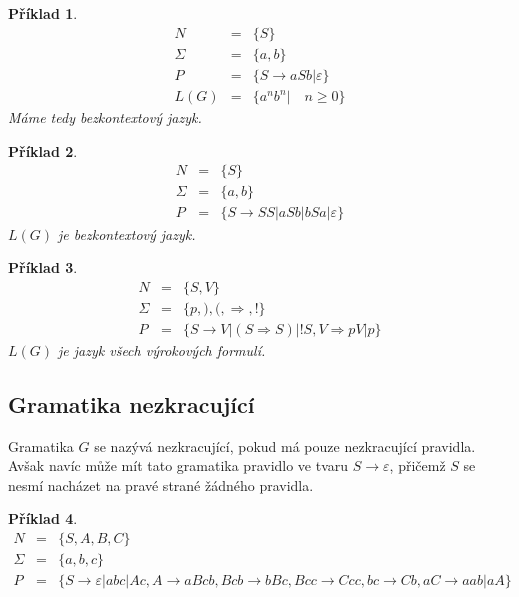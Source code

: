 \documentclass[10pt, a4paper, titlepage]{article}
\theoremstyle{note}
\newtheorem{priklad}{Příklad}
\begin{document}
\vspace{30px}

\begin{priklad}
\begin{eqnarray*}
N &=& \lbrace S \rbrace \\
\Sigma &=& \lbrace a, b \rbrace \\
P &=& \lbrace S \rightarrow aSb | \varepsilon \rbrace \\
L(G) &=& \lbrace a^{n}b^{n} | \quad n \geq 0 \rbrace
\end{eqnarray*}
Máme tedy \emph{bezkontextový} jazyk.
\end{priklad}

\begin{priklad}
\begin{eqnarray*}
N &=& \lbrace S \rbrace \\
\Sigma &=& \lbrace a, b \rbrace \\
P &=& \lbrace S \rightarrow SS|aSb|bSa| \varepsilon \rbrace
\end{eqnarray*}
$L(G)$ je \emph{bezkontextový} jazyk.
\end{priklad}

\begin{priklad}
\begin{eqnarray*}
N &=& \lbrace S, V \rbrace \\
\Sigma &=& \lbrace p,),(, \Rightarrow, ! \rbrace \\
P &=& \lbrace S \rightarrow V|(S \Rightarrow S)|!S, V \Rightarrow pV|p \rbrace
\end{eqnarray*}
$L(G)$ je jazyk všech výrokových formulí.
\end{priklad}


\subsection{Gramatika nezkracující}
Gramatika $G$ se nazývá nezkracující, pokud má pouze nezkracující
pravidla. Avšak navíc může mít tato gramatika pravidlo ve
tvaru $S \rightarrow \varepsilon$, přičemž $S$ se nesmí nacházet na pravé strané žádného pravidla.

\begin{priklad}
\begin{eqnarray*}
N &=& \lbrace S, A, B, C\rbrace \\
\Sigma &=& \lbrace a, b, c\rbrace \\
P &=& \lbrace S \rightarrow \varepsilon |abc|Ac, A \rightarrow aBcb, Bcb \rightarrow bBc, Bcc \rightarrow Ccc, bc \rightarrow Cb, aC \rightarrow aab|aA \rbrace
\end{eqnarray*}
\end{priklad}
\end{document}
